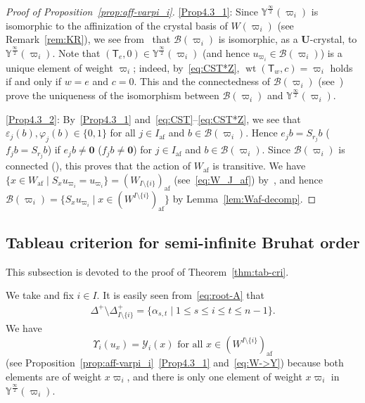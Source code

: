 \documentclass[ALCO,ThmDefs,Unicode,epreuves]{cedram}
\newcommand\bm[1]{\boldsymbol{#1}}
\renewcommand{\U}{\mathbf{U}}
\newcommand{\si}{\frac{\infty}{2}}
\DeclareMathOperator{\af}{af}
\DeclareMathOperator{\wt}{wt}
\begin{document}
\begin{proof}[Proof of Proposition~\ref{prop:aff-varpi_i}]
\ref{Prop4.3_1}: 
Since 
$\mathbb{Y}^{\si}(\varpi_i)$ 
is isomorphic to the affinization of the crystal basis of 
$W(\varpi_i)$ (see Remark~\ref{rem:KR}), 
we see from~\cite[Proposition~5.4~(ii) and Theorem~5.17~(vii)]{K02}
that 
$\mathcal{B}(\varpi_i)$
is isomorphic, as a $\U$-crystal, to 
$\mathbb{Y}^{\si}(\varpi_i)$. 
Note that 
$(\mathsf{T}_e , 0) \in \mathbb{Y}^{\si}(\varpi_i)$ 
(and hence $u_{\varpi_i} \in \mathcal{B}(\varpi_i)$)
is a unique element of weight $\varpi_i$; 
indeed, by~\eqref{eq:CST*Z}, 
$\wt (\mathsf{T}_w,c) = \varpi_i$ 
holds if and only if 
$w = e$ and $c = 0$.
This and the connectedness of 
$\mathcal{B}(\varpi_i)$ 
(see~\cite[Proposition~5.4~(ii)]{K02})
prove the uniqueness of the isomorphism between 
$\mathcal{B}(\varpi_i)$
and 
$\mathbb{Y}^{\si}(\varpi_i)$.

\ref{Prop4.3_2}: 
By~\ref{Prop4.3_1} and~\eqref{eq:CST}--\eqref{eq:CST*Z}, we see that 
$\varepsilon_j(b) , \varphi_j(b) \in \{ 0,1 \}$ 
for all 
$j \in I_{\af}$ 
and 
$b \in \mathcal{B}(\varpi_i)$. 
Hence 
$e_j b = S_{r_j} b$
(\resp $f_j b = S_{r_j} b$) 
if 
$e_j b \neq \bm{0}$
(\resp $f_j b\neq \bm{0}$)
for $j \in I_{\af}$ and $b \in \mathcal{B}(\varpi_i)$. 
Since 
$\mathcal{B}(\varpi_i)$
is connected 
(\cite[Proposition~5.4~(ii)]{K02}), 
this proves that the action of 
$W_{\af}$ 
is transitive. 
We have 
$\{ x \in W_{\af} \mid S_x u_{\varpi_i} = u_{\varpi_i} \} = (W_{I \setminus \{ i \}})_{\af}$
(see~\eqref{eq:W_J_af}) 
by~\cite[Proposition~5.1.1]{INS16}, and hence 
$\mathcal{B}(\varpi_i) = \{ S_x u_{\varpi_i} \mid x \in (W^{I \setminus \{ i \}})_{\af} \}$
by Lemma~\ref{lem:Waf-decomp}. 
\end{proof}

\subsection{Tableau criterion for semi-infinite Bruhat order} \label{Subsection:tab-cri}

This subsection is devoted to the proof of Theorem~\ref{thm:tab-cri}.

We take and fix 
$i \in I$. 
It is easily seen from~\eqref{eq:root-A} that
\begin{align} \label{eq:Delta^i}
\Delta^+ \setminus \Delta_{I \setminus \{ i \}}^+
=
\{ \alpha_{s,t} \mid 1 \leq s \leq i \leq t \leq n-1 \} .
\end{align}
We have 
\begin{equation}
\Upsilon_i(u_x) = \mathcal{Y}_i(x)\text{ for all }x \in (W^{I \setminus \{ i \}})_{\af}
\end{equation} 
(see Proposition~\ref{prop:aff-varpi_i}~\ref{Prop4.3_1} and~\eqref{eq:W->Y}) 
because both elements are of weight $x\varpi_i$, 
and there is only one element of weight $x\varpi_i$ in 
$\mathbb{Y}^{\si}(\varpi_i)$.
\end{document}
